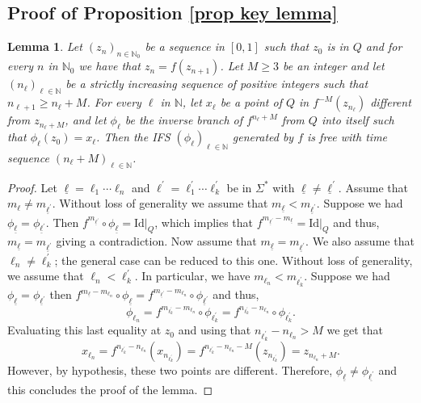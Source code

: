 \documentclass[12pt]{amsart}
\numberwithin{equation}{section} %
\numberwithin{figure}{section} %
\theoremstyle{plain}
\newtheorem{lemm}[prop]{Lemma}
\theoremstyle{definition}
\theoremstyle{remark}
\theoremstyle{citing}
\newcommand{\N}{\mathbb{N}}
\renewcommand{\=}{\coloneqq}
\begin{document}
\subsection{Proof of Proposition \ref{prop key lemma}}
    \begin{lemm}\label{lemma A2}
        Let $(z_n)_{n\in\N_0}$ be a sequence in $[0,1]$ such that $z_0$ is in $Q$ and for every $n$ in $\N_0$ we have that $z_n = f(z_{n+1})$. Let $M\geq 3$ be an integer and let $(n_\ell)_{\ell\in \N}$ be a strictly increasing sequence of positive integers such that $n_{\ell+1}\geq n_\ell + M$. For every $\ell$ in $\N$, let $x_\ell$ be a point of $Q$ in $f^{-M}(z_{n_\ell})$ different from $z_{n_\ell + M}$, and let $\phi_\ell$ be the inverse branch of $f^{n_\ell + M}$ from $Q$ into itself such that $\phi_\ell(z_0)=x_\ell$. Then the IFS $(\phi_\ell)_{\ell\in\N}$ generated by $f$ is free with time sequence $(n_\ell + M)_{\ell\in \N}$.
    \end{lemm}
    \begin{proof}
        Let $\underline{\ell}= \ell_1\cdots\ell_n$ and $\ell^{'}= \ell_1^{'}\cdots \ell_k^{'}$ be in $\Sigma^*$ with $\underline{\ell}\neq \underline{\ell}^{'}$. Assume that $m_{\ell} \neq m_{\underline{\ell}^{'}}$. Without loss of generality we assume that $m_{\underline{\ell}}<m_{\underline{\ell}^{'}}$. Suppose we had $\phi_{\underline{\ell}}=\phi_{\underline{\ell}^{'}}$. Then 
        $f^{m_{\underline{\ell}^{'}}}\circ \phi_{\underline{\ell}}= \text{Id}|_{Q}$, which implies that $f^{m_{\underline{\ell}^{'}}-m_{\underline{\ell}}}= \text{Id}|_{Q}$ and thus, $m_{\underline{\ell}}= m_{\underline{\ell}^{'}}$ giving a contradiction. Now assume that $m_{\underline{\ell}}=m_{\underline{\ell}^{'}}$. We also assume that $\ell_n\neq \ell_k^{'}$; the general case can be reduced to this one. Without loss of generality, we assume that $\ell_n<\ell_k^{'}$. In particular, we have $m_{\ell_n}<m_{\ell_k^{'}}$. Suppose we had $\phi_{\underline{\ell}}= \phi_{\underline{\ell}^{'}}$ then $f^{m_{\underline{\ell}}-m_{\ell_n}}\circ \phi_{\underline{\ell}}= f^{m_{\underline{\ell}^{'}}-m_{\ell_n}}\circ \phi_{\underline{\ell}^{'}}$ and thus,
        \begin{equation*}
            \phi_{\ell_n}= f^{m_{\ell_k^{'}}-m_{\ell_n}}\circ \phi_{\ell_k^{'}}= f^{n_{\ell_k^{'}}-n_{\ell_n}}\circ \phi_{\ell_k^{'}}.
        \end{equation*}
        Evaluating this last equality at $z_0$ and using that $n_{\ell_k^{'}}-n_{\ell_n}>M$ we get that
        \begin{equation*}
            x_{\ell_n}= f^{n_{\ell_k^{'}}-n_{\ell_n}}(x_{n_{\ell_k^{'}}})= f^{n_{\ell_k^{'}}-n_{\ell_n}-M}(z_{n_{\ell_k^{'}}}) = z_{n_{\ell_n}+M}.
        \end{equation*}
        However, by hypothesis, these two points are different. Therefore, $\phi_{\underline{\ell}}\neq \phi_{\underline{\ell^{'}}}$ and this concludes the proof of the lemma.
    \end{proof}
\end{document}
